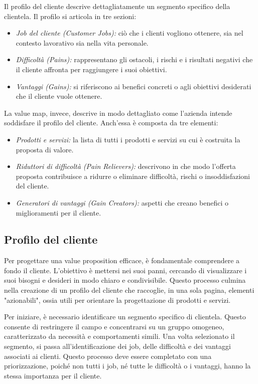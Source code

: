 Il profilo del cliente descrive dettagliatamente un segmento specifico della clientela. Il profilo si articola in tre sezioni:
\begin{itemize}
    \item \textit{Job del cliente (Customer Jobs):} ciò che i clienti vogliono ottenere, sia nel contesto lavorativo sia nella vita personale.
    \item \textit{Difficoltà (Pains):} rappresentano gli ostacoli, i rischi e i risultati negativi che il cliente affronta per raggiungere i suoi obiettivi.
    \item \textit{Vantaggi (Gains):} si riferiscono ai benefici concreti o agli obiettivi desiderati che il cliente vuole ottenere.
\end{itemize}
La value map, invece, descrive in modo dettagliato come l’azienda intende soddisfare il profilo del cliente. Anch’essa è composta da tre elementi:
\begin{itemize}
    \item \textit{Prodotti e servizi:} la lista di tutti i prodotti e servizi su cui è costruita la proposta di valore.
    \item \textit{Riduttori di difficoltà (Pain Relievers):} descrivono in che modo l’offerta proposta contribuisce a ridurre o eliminare difficoltà, rischi o insoddisfazioni del cliente.
    \item \textit{Generatori di vantaggi (Gain Creators):} aspetti che creano benefici o miglioramenti per il cliente.
\end{itemize}

\subsection{Profilo del cliente}
Per progettare una value proposition efficace, è fondamentale comprendere a fondo il cliente. L’obiettivo è mettersi nei suoi panni, cercando di visualizzare i suoi bisogni e desideri in modo chiaro e condivisibile. Questo processo culmina nella creazione di un profilo del cliente che raccoglie, in una sola pagina, elementi "azionabili", ossia utili per orientare la progettazione di prodotti e servizi.

Per iniziare, è necessario identificare un segmento specifico di clientela. Questo consente di restringere il campo e concentrarsi su un gruppo omogeneo, caratterizzato da necessità e comportamenti simili. Una volta selezionato il segmento, si passa all’identificazione dei job, delle difficoltà e dei vantaggi associati ai clienti. Questo processo deve essere completato con una priorizzazione, poiché non tutti i job, né tutte le difficoltà o i vantaggi, hanno la stessa importanza per il cliente.

